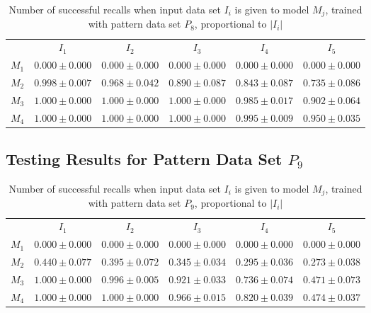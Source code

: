 \documentclass[12pt]{article}
\begin{document}
\begin{appendices}
\begin{table}[H]
\begin{tabular}{cccccc}
 & $I_{1}$  & $I_{2}$  & $I_{3}$  & $I_{4}$  & $I_{5}$ \\ \cline{2-6}
$M_{1}$  & $0.000\pm0.000$  & $0.000\pm0.000$  & $0.000\pm0.000$  & $0.000\pm0.000$  & $0.000\pm0.000$ \\
$M_{2}$  & $0.998\pm0.007$  & $0.968\pm0.042$  & $0.890\pm0.087$  & $0.843\pm0.087$  & $0.735\pm0.086$ \\
$M_{3}$  & $1.000\pm0.000$  & $1.000\pm0.000$  & $1.000\pm0.000$  & $0.985\pm0.017$  & $0.902\pm0.064$ \\
$M_{4}$  & $1.000\pm0.000$  & $1.000\pm0.000$  & $1.000\pm0.000$  & $0.995\pm0.009$  & $0.950\pm0.035$ \\

    \end{tabular}
    \caption{Number of successful recalls when input data set $I_i$ is given to model $M_j$, trained with pattern data set $P_{8}$, proportional to $\left|I_i\right|$}
    \end{table}
    
\subsection{Testing Results for Pattern Data Set $P_{9}$}


    \begin{table}[H]
    \centering
    \def\arraystretch{1.5}
    \footnotesize
    \begin{tabular}{cccccc}
    
 & $I_{1}$  & $I_{2}$  & $I_{3}$  & $I_{4}$  & $I_{5}$ \\ \cline{2-6}
$M_{1}$  & $0.000\pm0.000$  & $0.000\pm0.000$  & $0.000\pm0.000$  & $0.000\pm0.000$  & $0.000\pm0.000$ \\
$M_{2}$  & $0.440\pm0.077$  & $0.395\pm0.072$  & $0.345\pm0.034$  & $0.295\pm0.036$  & $0.273\pm0.038$ \\
$M_{3}$  & $1.000\pm0.000$  & $0.996\pm0.005$  & $0.921\pm0.033$  & $0.736\pm0.074$  & $0.471\pm0.073$ \\
$M_{4}$  & $1.000\pm0.000$  & $1.000\pm0.000$  & $0.966\pm0.015$  & $0.820\pm0.039$  & $0.474\pm0.037$ \\

    \end{tabular}
    \caption{Number of successful recalls when input data set $I_i$ is given to model $M_j$, trained with pattern data set $P_{9}$, proportional to $\left|I_i\right|$}
    \end{table}
    

\end{appendices}
\end{document}
